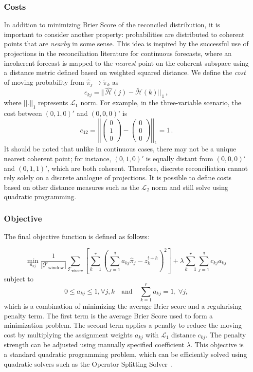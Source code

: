 \documentclass[a4paper,review,12pt,authoryear]{elsarticle}
\theoremstyle{definition}
\begin{document}
    \subsubsection*{\textbf{Costs}}
    In addition to minimizing Brier Score of the reconciled distribution, it is important to consider another property: probabilities are distributed to coherent points that are \emph{nearby} in some sense.
    This idea is inspired by the successful use of projections in the reconciliation literature for continuous forecasts, where an incoherent forecast is mapped to the \emph{nearest} point on the coherent subspace using a distance metric defined based on weighted squared distance.
    We define the \emph{cost} of moving probability from $\hat{\pi}_j\rightarrow\tilde{\pi}_k$ as
    \[
    c_{kj}=||\hat{\mathcal{H}}(j)-\tilde{\mathcal{H}}(k)||_1\,,
    \]
    where $||.||_1$ represents $\mathcal{L}_1$ norm. For example, in the three-variable scenario, the cost between $(0, 1, 0)'$ and $(0, 0, 0)$' is
    \[
    c_{12}=\left|\left|\begin{pmatrix}0\\1\\0\end{pmatrix}-\begin{pmatrix}0\\0\\0\end{pmatrix}\right|\right|_1=1\,.
    \]
    It should be noted that unlike in continuous cases, there may not be a unique nearest coherent point; for instance, $(0,1,0)'$ is equally distant from $(0,0,0)'$ and $(0,1,1)'$, which are both coherent.
    Therefore, discrete reconciliation cannot rely solely on a discrete analogue of projections. It is possible to define costs based on other distance measures such as the $\mathcal{L}_2$ norm and still solve using quadratic programming.


    \subsubsection*{\textbf{Objective}}

    The final objective function is defined as follows:

    \[
    \underset{a_{kj}}{\min} \frac{1}{|\mathcal{T}_{\textrm{window}}|}\sum\limits_{\mathcal{T}_{\textrm{window}}}\left[\sum\limits_{k=1}^r\left(\sum\limits_{j=1}^q a_{kj}\hat{{\pi}}_j-z^{t+h}_k\right)^2\right] + \lambda\sum\limits_{k=1}^r\sum\limits_{j=1}^q c_{kj}a_{kj}\,
    \]
    subject to
    \[
    0\leq a_{kj}\leq 1,\forall j, k \quad \text{and} \quad
    \sum\limits_{k=1}^r a_{kj} = 1,~\forall j,
    \]
    which is a combination of minimizing the average Brier score and a regularising penalty term.
    The first term is the average Brier Score used to form a minimization problem. The second term applies a penalty to reduce the moving cost by multiplying the assignment weights $a_{kj}$ with $\mathcal{L}_1$ distance $c_{kj}$.
    The penalty strength can be adjusted using manually specified coefficient $\lambda$.
    This objective is a standard quadratic programming problem, which can be efficiently solved using quadratic solvers such as the Operator Splitting Solver~\citep[OSQP,][]{stellatoOSQPOperatorSplitting2020}.
\end{document}

